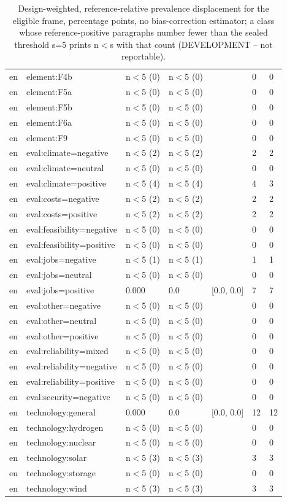 \begin{table}[htbp]
\begin{tabular}{lllllll}
en & element:F4b & n$<$5 (0) & n$<$5 (0) &  & 0 & 0 \\
en & element:F5a & n$<$5 (0) & n$<$5 (0) &  & 0 & 0 \\
en & element:F5b & n$<$5 (0) & n$<$5 (0) &  & 0 & 0 \\
en & element:F6a & n$<$5 (0) & n$<$5 (0) &  & 0 & 0 \\
en & element:F9 & n$<$5 (0) & n$<$5 (0) &  & 0 & 0 \\
en & eval:climate=negative & n$<$5 (2) & n$<$5 (2) &  & 2 & 2 \\
en & eval:climate=neutral & n$<$5 (0) & n$<$5 (0) &  & 0 & 0 \\
en & eval:climate=positive & n$<$5 (4) & n$<$5 (4) &  & 4 & 3 \\
en & eval:costs=negative & n$<$5 (2) & n$<$5 (2) &  & 2 & 2 \\
en & eval:costs=positive & n$<$5 (2) & n$<$5 (2) &  & 2 & 2 \\
en & eval:feasibility=negative & n$<$5 (0) & n$<$5 (0) &  & 0 & 0 \\
en & eval:feasibility=positive & n$<$5 (0) & n$<$5 (0) &  & 0 & 0 \\
en & eval:jobs=negative & n$<$5 (1) & n$<$5 (1) &  & 1 & 1 \\
en & eval:jobs=neutral & n$<$5 (0) & n$<$5 (0) &  & 0 & 0 \\
en & eval:jobs=positive & 0.000 & 0.0 & [0.0, 0.0] & 7 & 7 \\
en & eval:other=negative & n$<$5 (0) & n$<$5 (0) &  & 0 & 0 \\
en & eval:other=neutral & n$<$5 (0) & n$<$5 (0) &  & 0 & 0 \\
en & eval:other=positive & n$<$5 (0) & n$<$5 (0) &  & 0 & 0 \\
en & eval:reliability=mixed & n$<$5 (0) & n$<$5 (0) &  & 0 & 0 \\
en & eval:reliability=negative & n$<$5 (0) & n$<$5 (0) &  & 0 & 0 \\
en & eval:reliability=positive & n$<$5 (0) & n$<$5 (0) &  & 0 & 0 \\
en & eval:security=negative & n$<$5 (0) & n$<$5 (0) &  & 0 & 0 \\
en & technology:general & 0.000 & 0.0 & [0.0, 0.0] & 12 & 12 \\
en & technology:hydrogen & n$<$5 (0) & n$<$5 (0) &  & 0 & 0 \\
en & technology:nuclear & n$<$5 (0) & n$<$5 (0) &  & 0 & 0 \\
en & technology:solar & n$<$5 (3) & n$<$5 (3) &  & 3 & 3 \\
en & technology:storage & n$<$5 (0) & n$<$5 (0) &  & 0 & 0 \\
en & technology:wind & n$<$5 (3) & n$<$5 (3) &  & 3 & 3 \\
\bottomrule
\end{tabular}
\caption{Design-weighted, reference-relative prevalence displacement for the eligible frame, percentage points, no bias-correction estimator; a class whose reference-positive paragraphs number fewer than the sealed threshold s=5 prints n$<$s with that count (DEVELOPMENT -- not reportable).}
\end{table}
